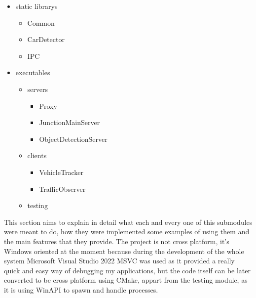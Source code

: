 \documentclass[17pt]{article}
\begin{document}
\begin{itemize}
    \item static librarys
    \begin{itemize}
        \item Common
        \item CarDetector
        \item IPC
    \end{itemize}
    
    \item executables
    \begin{itemize}
        \item servers
        \begin{itemize}
            \item Proxy
            \item JunctionMainServer
            \item ObjectDetectionServer
        \end{itemize}
        \item  clients
        \begin{itemize}
            \item VehicleTracker
            \item TrafficObserver
        \end{itemize}
        \item testing
    \end{itemize}
\end{itemize}

This section aims to explain in detail what each and every one of this submodules were meant to do,
how they were implemented some examples of using them and the main features that they
provide. The project is not cross platform, it's Windows oriented at the moment because
during the development of the whole system Microsoft Visual Studio 2022 MSVC was used
as it provided a really quick and easy way of debugging my applications, but 
the code itself can be later converted to be cross platform using CMake, appart from
the testing module, as it is using WinAPI to spawn and handle processes. 


\pagebreak
\end{document}

